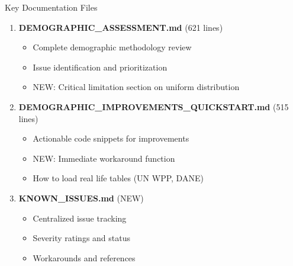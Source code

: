 \documentclass[aspectratio=169]{beamer}
\begin{document}
\begin{frame}{Key Documentation Files}
\begin{enumerate}
    \item \textbf{DEMOGRAPHIC\_ASSESSMENT.md} (621 lines)
    \begin{itemize}
        \item Complete demographic methodology review
        \item Issue identification and prioritization
        \item \textcolor{criticalred}{NEW:} Critical limitation section on uniform distribution
    \end{itemize}
    
    \vspace{0.2cm}
    
    \item \textbf{DEMOGRAPHIC\_IMPROVEMENTS\_QUICKSTART.md} (515 lines)
    \begin{itemize}
        \item Actionable code snippets for improvements
        \item \textcolor{criticalred}{NEW:} Immediate workaround function
        \item How to load real life tables (UN WPP, DANE)
    \end{itemize}
    
    \vspace{0.2cm}
    
    \item \textbf{KNOWN\_ISSUES.md} (NEW)
    \begin{itemize}
        \item Centralized issue tracking
        \item Severity ratings and status
        \item Workarounds and references
    \end{itemize}
\end{enumerate}
\end{frame}
\end{document}

